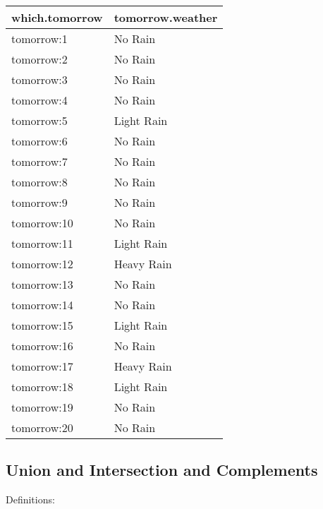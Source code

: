 \documentclass[
]{book}
\begin{document}
\begin{table}[!h]
\centering
\begin{tabular}{l|l}
\hline
which.tomorrow & tomorrow.weather\\
\hline
\rowcolor{gray!6}  tomorrow:1 & No Rain\\
\hline
tomorrow:2 & No Rain\\
\hline
\rowcolor{gray!6}  tomorrow:3 & No Rain\\
\hline
tomorrow:4 & No Rain\\
\hline
\rowcolor{gray!6}  tomorrow:5 & Light Rain\\
\hline
tomorrow:6 & No Rain\\
\hline
\rowcolor{gray!6}  tomorrow:7 & No Rain\\
\hline
tomorrow:8 & No Rain\\
\hline
\rowcolor{gray!6}  tomorrow:9 & No Rain\\
\hline
tomorrow:10 & No Rain\\
\hline
\rowcolor{gray!6}  tomorrow:11 & Light Rain\\
\hline
tomorrow:12 & Heavy Rain\\
\hline
\rowcolor{gray!6}  tomorrow:13 & No Rain\\
\hline
tomorrow:14 & No Rain\\
\hline
\rowcolor{gray!6}  tomorrow:15 & Light Rain\\
\hline
tomorrow:16 & No Rain\\
\hline
\rowcolor{gray!6}  tomorrow:17 & Heavy Rain\\
\hline
tomorrow:18 & Light Rain\\
\hline
\rowcolor{gray!6}  tomorrow:19 & No Rain\\
\hline
tomorrow:20 & No Rain\\
\hline
\end{tabular}
\end{table}

\hypertarget{union-and-intersection-and-complements}{%
\subsection{Union and Intersection and Complements}\label{union-and-intersection-and-complements}}

Definitions:
\end{document}

